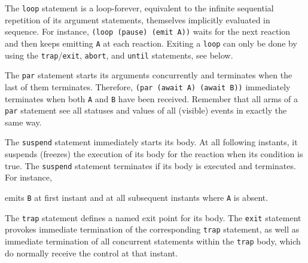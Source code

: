 \documentclass{llncs}
\begin{document}
The {\texttt{loop{}}} statement is a loop-forever, equivalent to the
infinite sequential repetition of its argument statements, themselves
implicitly evaluated in sequence.  For instance, {\texttt{(loop{} (pause{})
(emit{} A))}} waits for the next reaction and then keeps emitting {\texttt{A}}
at each reaction. 
Exiting a {\texttt{loop{}}} can only be
done by using the {\texttt{trap{}}}/{\texttt{exit{}}}, {\texttt{abort{}}}, and {\texttt{until{}}} statements, see below.

The {\texttt{par{}}} statement starts its arguments
concurrently and terminates when the last of them
terminates. Therefore, {\texttt{(par{} (await{} A)
(await{} B))}} immediately terminates when both {\texttt{A}} and
{\texttt{B}} have been received. Remember that all arms of a
{\texttt{par{}}} statement see all statuses and values of all
(visible) events in exactly the same way.

The {\texttt{suspend{}}} statement immediately starts its
body. At all following instants, it suspends (freezes) the execution
of its body for the reaction when its condition is true. The
{\texttt{suspend{}}} statement terminates if its body is
executed and terminates. For instance,

{\footnotesize{
}}
\noindent emits {\texttt{B}} at first instant and at all subsequent instants where {\texttt{A}}
is absent.

The {\texttt{trap{}}} statement defines a named exit point for its body.
The {\texttt{exit{}}} statement provokes immediate termination of the
corresponding {\texttt{trap{}}} statement, as well as immediate termination of
all concurrent statements within the {\texttt{trap{}}} body, which do normally
receive the control at that instant.
\end{document}
